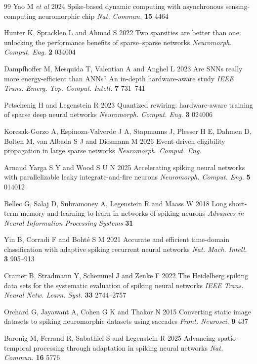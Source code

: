 \documentclass{iopjournal}
\begin{document}
\begin{thebibliography}{99}
 Yao M \textit{et al} 2024 Spike-based dynamic computing with asynchronous sensing-computing neuromorphic chip \textit{Nat. Commun.} \textbf{15} 4464

 Hunter K, Spracklen L and Ahmad S 2022 Two sparsities are better than one: unlocking the performance benefits of sparse--sparse networks \textit{Neuromorph. Comput. Eng.} \textbf{2} 034004

 Dampfhoffer M, Mesquida T, Valentian A and Anghel L 2023 Are SNNs really more energy-efficient than ANNs? An in-depth hardware-aware study \textit{IEEE Trans. Emerg. Top. Comput. Intell.} \textbf{7} 731--741

 Petschenig H and Legenstein R 2023 Quantized rewiring: hardware-aware training of sparse deep neural networks \textit{Neuromorph. Comput. Eng.} \textbf{3} 024006

 Korcsak-Gorzo A, Espinoza-Valverde J A, Stapmanns J, Plesser H E, Dahmen D, Bolten M, van Albada S J and Diesmann M 2026 Event-driven eligibility propagation in large sparse networks \textit{Neuromorph. Comput. Eng.}

 Arnaud Yarga S Y and Wood S U N 2025 Accelerating spiking neural networks with parallelizable leaky integrate-and-fire neurons \textit{Neuromorph. Comput. Eng.} \textbf{5} 014012

 Bellec G, Salaj D, Subramoney A, Legenstein R and Maass W 2018 Long short-term memory and learning-to-learn in networks of spiking neurons \textit{Advances in Neural Information Processing Systems} \textbf{31}

 Yin B, Corradi F and Boht\'e S M 2021 Accurate and efficient time-domain classification with adaptive spiking recurrent neural networks \textit{Nat. Mach. Intell.} \textbf{3} 905--913

 Cramer B, Stradmann Y, Schemmel J and Zenke F 2022 The Heidelberg spiking data sets for the systematic evaluation of spiking neural networks \textit{IEEE Trans. Neural Netw. Learn. Syst.} \textbf{33} 2744--2757

 Orchard G, Jayawant A, Cohen G K and Thakor N 2015 Converting static image datasets to spiking neuromorphic datasets using saccades \textit{Front. Neurosci.} \textbf{9} 437

 Baronig M, Ferrand R, Sabathiel S and Legenstein R 2025 Advancing spatio-temporal processing through adaptation in spiking neural networks \textit{Nat. Commun.} \textbf{16} 5776


\end{thebibliography}
\end{document}
